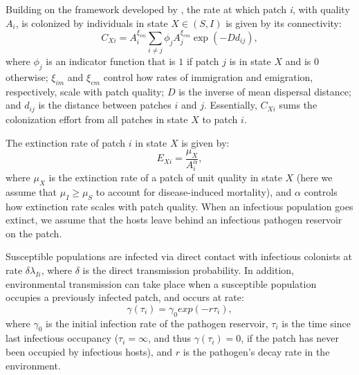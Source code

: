 \documentclass{svjour3}
\begin{document}
Building on the framework developed by \cite{Hanski2003}, the rate at which patch \emph{i}, with quality $A_i$, is colonized by individuals in state $X \in (S,I)$ is given by its connectivity:
\begin{equation}
C_{Xi}=A_i^{\xi_{im}} \sum_{i\neq j }\phi_jA_j^{\xi_{em}}\exp(-D d_{ij}),
\label{connectivity}
\end{equation}
where $\phi_j$ is an indicator function that is $1$ if patch $j$ is in state $X$ and is $0$ otherwise; $\xi_{im}$ and $\xi_{em}$ control how rates of immigration and emigration, respectively, scale with patch quality; $D$ is the inverse of mean dispersal distance; and $d_{ij}$ is the distance between patches $i$ and $j$.  Essentially, $C_{Xi}$ sums the colonization effort from all patches in state $X$ to patch $i$.  

The extinction rate of patch $i$ in state $X$ is given by:
\begin{equation}
E_{Xi}=\frac{\mu_X}{A_i^\alpha},
\end{equation}
where $\mu_X$ is the extinction rate of a patch of unit quality in state $X$ (here we assume that $\mu_I \geq \mu_S$ to account for disease-induced mortality), and $\alpha$ controls how extinction rate scales with patch quality.  When an infectious population goes extinct, we assume that the hosts leave behind an infectious pathogen reservoir on the patch.  

Susceptible populations are infected via direct contact with infectious colonists at rate $\delta \lambda_{Ii}$, where $\delta$ is the direct transmission probability.  In addition, environmental transmission can take place when a susceptible population occupies a previously infected patch, and occurs at rate:
\begin{equation}
\gamma(\tau_i)=\gamma_0exp(-r\tau_{i}),
\end{equation}
where $\gamma_0$ is the initial infection rate of the pathogen reservoir, $\tau_{i}$ is the time since last infectious occupancy ($\tau_{i} = \infty$, and thus $\gamma(\tau_i) = 0$, if the patch has never been occupied by infectious hosts), and $r$ is the pathogen's decay rate in the environment.
\end{document}
